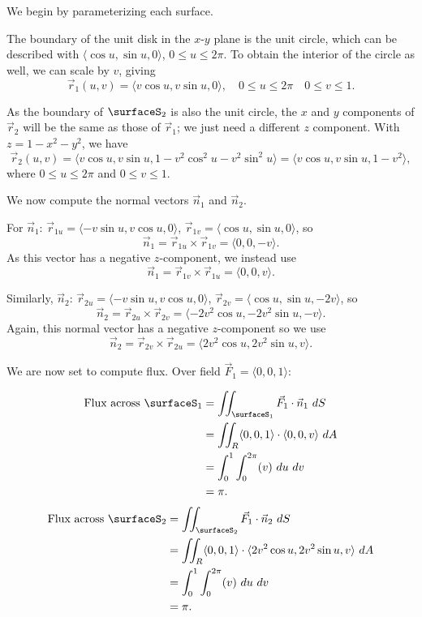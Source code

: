 {We begin by parameterizing each surface.

The boundary of the unit disk in the $x$-$y$ plane is the unit circle, which can be described with $\langle \cos u,\sin u,0\rangle$, $0\leq u\leq 2\pi$. To obtain the interior of the circle as well, we can scale by $v$, giving
$$\vec r_1(u,v) = \langle v\cos u,v\sin u, 0\rangle, \quad 0\leq u\leq 2\pi\quad 0\leq v\leq 1.$$

As the boundary of $\surfaceS_2$ is also the unit circle, the $x$ and $y$ components of $\vec r_2$ will be the same as those of $\vec r_1$; we just need a different $z$ component. With $z = 1-x^2-y^2$, we have
$$\vec r_2(u,v) = \langle v\cos u,v\sin u, 1-v^2\cos^2u-v^2\sin^2u\rangle = \langle v\cos u,v\sin u, 1-v^2\rangle,$$
where $0\leq u\leq 2\pi$ and $0\leq v\leq 1$.

We now compute the normal vectors $\vec n_1$ and $\vec n_2$.

For $\vec n_1$: $\vec r_{1u}= \langle -v\sin u, v\cos u,0\rangle$, $\vec r_{1v} = \langle \cos u,\sin u,0\rangle$, so
$$\vec n_1 = \vec r_{1u}\times \vec r_{1v} = \langle 0,0,-v\rangle.$$
As this vector has a negative $z$-component, we instead use
$$\vec n_1 = \vec r_{1v}\times \vec r_{1u} = \langle 0,0,v\rangle.$$

Similarly, $\vec n_2$: $\vec r_{2u}= \langle -v\sin u, v\cos u,0\rangle$, $\vec r_{2v} = \langle \cos u,\sin u,-2v\rangle$, so 
$$\vec n_2 = \vec r_{2u}\times \vec r_{2v} = \langle -2v^2\cos u,-2v^2\sin u,-v\rangle.$$ 
Again, this normal vector has a negative $z$-component so we use
$$\vec n_2 = \vec r_{2v}\times \vec r_{2u} = \langle 2v^2\cos u,2v^2\sin u,v\rangle.$$ 

We are now set to compute flux. Over field $\vec F_1=\langle 0,0,1\rangle$:

\begin{align*}
\text{Flux across $\surfaceS_1$} &= \iint_{\surfaceS_1} \vec F_1\cdot \vec n_1\ dS \\
						&= \iint_R\langle 0,0,1\rangle\cdot\langle 0,0,v\rangle\ dA\\
						&= \int_0^1\int_0^{2\pi} (v)\ du\ dv\\
						&= \pi.
\end{align*}
\drawexampleline%
\begin{align*}
\text{Flux across $\surfaceS_2$} &= \iint_{\surfaceS_2} \vec F_1\cdot \vec n_2\ dS \\
						&= \iint_R\langle 0,0,1\rangle\cdot\langle 2v^2\cos u,2v^2\sin u,v\rangle\ dA\\
						&= \int_0^1\int_0^{2\pi} (v)\ du\ dv\\
						&= \pi.
\end{align*}

}
